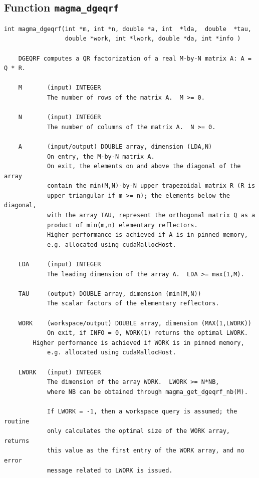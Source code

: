 \documentclass[10pt]{book}
\begin{document}
\newpage
\subsection{Function {\tt {\bf magma\_dgeqrf}}}
\begin{verbatim}
int magma_dgeqrf(int *m, int *n, double *a, int  *lda,  double  *tau,
                 double *work, int *lwork, double *da, int *info )
   
    DGEQRF computes a QR factorization of a real M-by-N matrix A: A = Q * R.   

    M       (input) INTEGER   
            The number of rows of the matrix A.  M >= 0.   

    N       (input) INTEGER   
            The number of columns of the matrix A.  N >= 0.   

    A       (input/output) DOUBLE array, dimension (LDA,N)   
            On entry, the M-by-N matrix A.   
            On exit, the elements on and above the diagonal of the array   
            contain the min(M,N)-by-N upper trapezoidal matrix R (R is   
            upper triangular if m >= n); the elements below the diagonal,   
            with the array TAU, represent the orthogonal matrix Q as a   
            product of min(m,n) elementary reflectors.   
            Higher performance is achieved if A is in pinned memory, 
            e.g. allocated using cudaMallocHost.

    LDA     (input) INTEGER   
            The leading dimension of the array A.  LDA >= max(1,M).   

    TAU     (output) DOUBLE array, dimension (min(M,N))   
            The scalar factors of the elementary reflectors.   

    WORK    (workspace/output) DOUBLE array, dimension (MAX(1,LWORK))   
            On exit, if INFO = 0, WORK(1) returns the optimal LWORK.   
	    Higher performance is achieved if WORK is in pinned memory, 
            e.g. allocated using cudaMallocHost.

    LWORK   (input) INTEGER   
            The dimension of the array WORK.  LWORK >= N*NB, 
            where NB can be obtained through magma_get_dgeqrf_nb(M).   

            If LWORK = -1, then a workspace query is assumed; the routine   
            only calculates the optimal size of the WORK array, returns   
            this value as the first entry of the WORK array, and no error   
            message related to LWORK is issued.


\end{verbatim}
\end{document}
